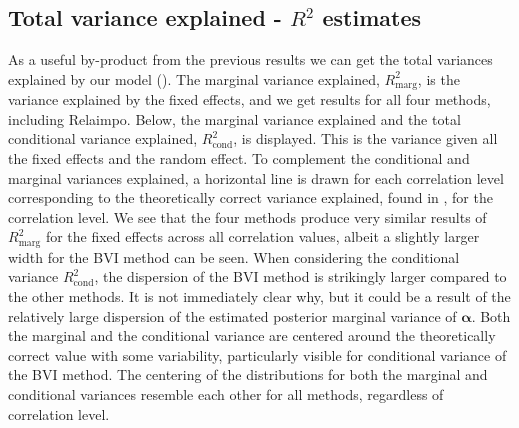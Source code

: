 \subsection{Total variance explained - \texorpdfstring{$R^2$}{Lg} estimates}
\label{sec:R2} 
As a useful by-product from the previous results we can get the total variances explained by our model ().
The marginal variance explained, $R^2_{\text{marg}}$, is the variance explained by the fixed effects, and we get results for all four methods, including Relaimpo.
Below, the marginal variance explained and the total conditional variance explained, $R^2_{\text{cond}}$, is displayed. 
This is the variance given all the fixed effects and the random effect.
To complement the conditional and marginal variances explained, a horizontal line is drawn for each correlation level corresponding to the theoretically correct variance explained, found in , for the correlation level. 
\newline
\newline
We see that the four methods produce very similar results of $R^2_{\text{marg}}$ for the fixed effects across all correlation values, albeit a slightly larger width for the BVI method can be seen.
When considering the conditional variance $R^2_{\text{cond}}$, the dispersion of the BVI method is strikingly larger compared to the other methods. 
It is not immediately clear why, but it could be a result of the relatively large dispersion of the estimated posterior marginal variance of $\boldsymbol{\alpha}$.
Both the marginal and the conditional variance are centered around the theoretically correct value with some variability, particularly visible for conditional variance of the BVI method. 
The centering of the distributions for both the marginal and conditional variances resemble each other for all methods, regardless of correlation level.
